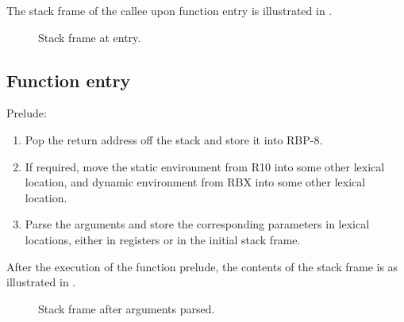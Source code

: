 The stack frame of the callee upon function entry is illustrated in
.

\begin{figure}
\begin{center}
\end{center}
\caption{\label{fig-x86-64-alternative-stack-frame-at-entry}
Stack frame at entry.}
\end{figure}

\subsection{Function entry}

Prelude:

\begin{enumerate}
\item Pop the return address off the stack and store it into RBP-8.
\item If required, move the static environment from R10 into some
  other lexical location, and dynamic environment from RBX into some
  other lexical location.
\item Parse the arguments and store the corresponding parameters in
  lexical locations, either in registers or in the initial stack
  frame.
\end{enumerate}

After the execution of the function prelude, the contents of the stack
frame is as illustrated in
.

\begin{figure}
\begin{center}
\end{center}
\caption{\label{fig-x86-64-alternative-stack-frame-after-arguments-parsed}
Stack frame after arguments parsed.}
\end{figure}

